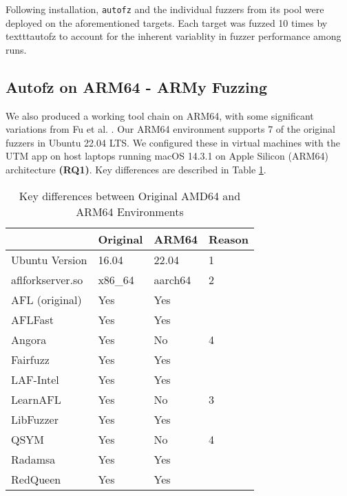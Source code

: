 Following installation, \texttt{autofz} and the individual fuzzers from its pool were deployed on the aforementioned targets. Each 
target was fuzzed 10 times by texttt{autofz} to account for the inherent variablity in fuzzer performance among runs. 

\subsection{Autofz on ARM64 - ARMy Fuzzing}

We also produced a working tool chain on ARM64, with some significant 
variations from Fu et al. \cite{fu_autofz_2023}. Our ARM64 environment supports 7 of 
the original fuzzers in Ubuntu 22.04 LTS. We configured these in virtual machines 
with the UTM app on host laptops running macOS 14.3.1 on Apple Silicon (ARM64) 
architecture \textbf{(RQ1)}. Key differences are described in Table \ref{arm64-characteristics}.

\begin{table}[ht]
    \begin{tabular}{|l|l|l|l|}
        \hline
                        & Original\cite{fu_autofz_2023} & ARM64 & Reason \\
        \hline
        Ubuntu Version  & 16.04             & 22.04 & 1 \\
        \hline
        aflforkserver.so    & x86\_64           & aarch64 & 2 \\
        \hline
        AFL (original)  & Yes               & Yes & \\
        \hline
        AFLFast         & Yes               & Yes & \\
        \hline
        Angora          & Yes               & No & 4 \\
        \hline
        Fairfuzz        & Yes               & Yes & \\
        \hline
        LAF-Intel       & Yes               & Yes & \\
        \hline
        LearnAFL        & Yes               & No & 3 \\
        \hline
        LibFuzzer       & Yes               & Yes & \\
        \hline
        QSYM            & Yes               & No & 4 \\
        \hline
        Radamsa         & Yes               & Yes & \\
        \hline
        RedQueen        & Yes               & Yes & \\
        \hline
    \end{tabular}
    \caption{Key differences between Original AMD64 and ARM64 Environments}
    \label{arm64-characteristics}
\end{table}

